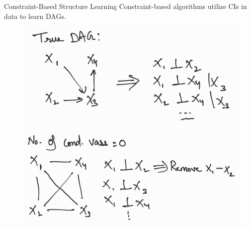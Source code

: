 \documentclass{beamer}
\begin{document}
\begin{frame}{Constraint-Based Structure Learning}
	\center Constraint-based algorithms utilize CIs in data to learn DAGs.

	\begin{figure}
		\centering
		\includegraphics[scale=0.12]{imgs/example1.png}
	\end{figure}
	\begin{figure}
		\centering
		\includegraphics[scale=0.12]{imgs/example2.png}
	\end{figure}
\end{frame}
\end{document}
